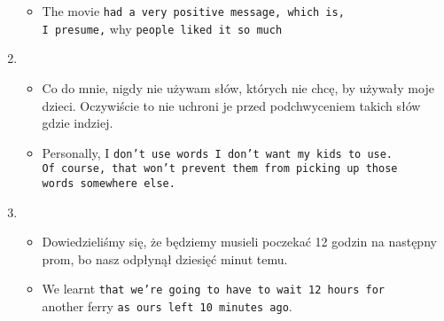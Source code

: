 \documentclass[a4paper]{article}
\begin{document}
\begin{enumerate}
\begin{itemize}
        \item The movie {\tt had a very positive message, which is,\\I presume,} why {\tt people liked it so much}
    \end{itemize}
    \item \begin{itemize}
        \item Co do mnie, nigdy nie używam słów, których nie chcę, by używały moje dzieci. Oczywiście to nie uchroni je przed podchwyceniem takich słów gdzie indziej.
        \item Personally, I {\tt don't use words I don't want my kids to use.\\Of course, that won't prevent them from picking up those\\words somewhere else.}
    \end{itemize}
    \item \begin{itemize}
        \item Dowiedzieliśmy się, że będziemy musieli poczekać 12 godzin na następny prom, bo nasz odpłynął dziesięć minut temu.
        \item We learnt {\tt that we're going to have to wait 12 hours for}\\another ferry {\tt as ours left 10 minutes ago}.
    \end{itemize}
\end{enumerate}
\pagebreak
\end{document}
